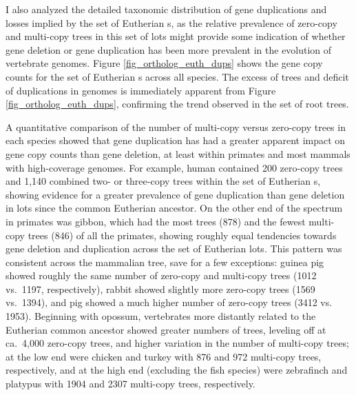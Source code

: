 I also analyzed the detailed taxonomic distribution of gene
duplications and losses implied by the set of Eutherian \subtr{}s, as
the relative prevalence of zero-copy and multi-copy trees in this set
of \acp{lot} might provide some indication of whether gene deletion or
gene duplication has been more prevalent in the evolution of
vertebrate genomes. Figure \ref{fig_ortholog_euth_dups} shows the gene
copy counts for the set of Eutherian \subtr{}s across all \ens
species. The excess of \zcop trees and deficit
of duplications in \lcv genomes is immediately apparent from Figure
\ref{fig_ortholog_euth_dups}, confirming the trend observed in the set
of root \cmp trees.

A quantitative comparison of the number of multi-copy versus zero-copy
trees in each species showed that gene duplication has had a greater
apparent impact on gene copy counts than gene deletion, at least
within primates and most mammals with high-coverage genomes. For
example, human contained 200 zero-copy trees and 1,140 combined two-
or three-copy trees within the set of Eutherian \subtr{}s, showing
evidence for a greater prevalence of gene duplication than gene
deletion in \acp{lot} since the common Eutherian ancestor. On the
other end of the spectrum in primates was gibbon, which had the most
\zcop trees (878) and the fewest multi-copy trees (846) of all the
primates, showing roughly equal tendencies towards gene deletion and
duplication across the set of Eutherian \acp{lot}. This pattern was
consistent across the mammalian tree, save for a few exceptions:
guinea pig showed roughly the same number of zero-copy and multi-copy
trees (1012 vs.~1197, respectively), rabbit showed slightly more
zero-copy trees (1569 vs.~1394), and pig showed a much higher number
of zero-copy trees (3412 vs. 1953). Beginning with opossum,
vertebrates more distantly related to the Eutherian common ancestor
showed greater numbers of \zcop trees, leveling off at ca.~4,000
zero-copy trees, and higher variation in the number of multi-copy
trees; at the low end were chicken and turkey with 876 and 972
multi-copy trees, respectively, and at the high end (excluding the
fish species) were zebrafinch and platypus with 1904 and 2307
multi-copy trees, respectively.

